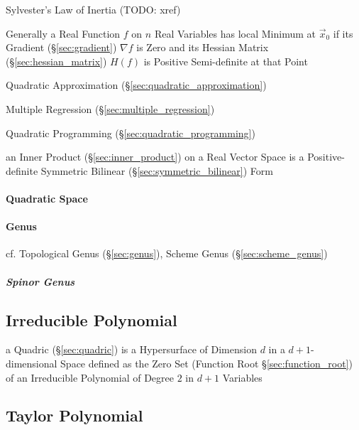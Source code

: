 \fist Sylvester's Law of Inertia (TODO: xref)

Generally a Real Function $f$ on $n$ Real Variables has local Minimum at
$\vec{x}_0$ if its Gradient (\S\ref{sec:gradient}) $\nabla f$ is Zero and its
Hessian Matrix (\S\ref{sec:hessian_matrix}) $H(f)$ is Positive Semi-definite at
that Point

\fist Quadratic Approximation (\S\ref{sec:quadratic_approximation})

\fist Multiple Regression (\S\ref{sec:multiple_regression})

\fist Quadratic Programming (\S\ref{sec:quadratic_programming})

an Inner Product (\S\ref{sec:inner_product}) on a Real Vector Space is
a Positive-definite Symmetric Bilinear
(\S\ref{sec:symmetric_bilinear}) Form



\paragraph{Quadratic Space}\label{sec:quadratic_space}\hfill

\paragraph{Genus}\label{sec:quadratic_genus}\hfill

\fist cf. Topological Genus (\S\ref{sec:genus}), Scheme Genus
(\S\ref{sec:scheme_genus})



\subparagraph{Spinor Genus}\label{sec:spinor_genus}\hfill



\subsection{Irreducible Polynomial}\label{sec:irreducible_polynomial}

\fist a Quadric (\S\ref{sec:quadric}) is a Hypersurface of Dimension $d$ in a
$d+1$-dimensional Space defined as the Zero Set (Function Root
\S\ref{sec:function_root}) of an Irreducible Polynomial of Degree $2$ in $d+1$
Variables



\subsection{Taylor Polynomial}\label{sec:taylor_polynomial}

